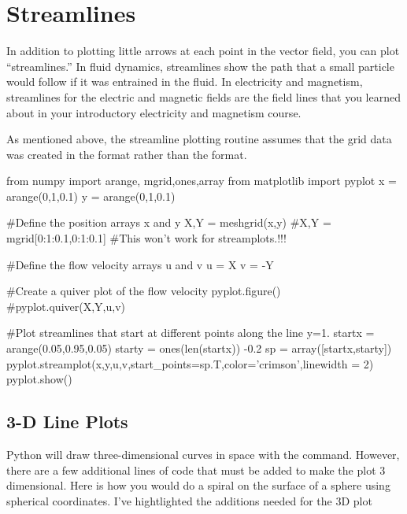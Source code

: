 \section{Streamlines}

In addition to plotting little arrows at each point in the vector field, you
can plot ``streamlines.'' In fluid dynamics, streamlines show the path that
a small particle would follow if it was entrained in the fluid.  In electricity and magnetism, streamlines for the
electric and magnetic fields are the field lines that you learned about in
your introductory electricity and magnetism course.

As mentioned above, the streamline plotting routine assumes that the grid data
was created in the  format rather than the  format.

\begin{codeexample}
\begin{VerbatimOut}{\listingFile}
from numpy import arange, mgrid,ones,array
from matplotlib import pyplot
x = arange(0,1,0.1)
y = arange(0,1,0.1)

#Define the position arrays x and y
X,Y = meshgrid(x,y)
#X,Y = mgrid[0:1:0.1,0:1:0.1]  #This won't work for streamplots.!!!

#Define the flow velocity arrays u and v
u = X
v = -Y

#Create a quiver plot of the flow velocity
pyplot.figure()
#pyplot.quiver(X,Y,u,v)

#Plot streamlines that start at different points along the line y=1.
startx = arange(0.05,0.95,0.05)
starty = ones(len(startx)) -0.2
sp = array([startx,starty])
pyplot.streamplot(x,y,u,v,start_points=sp.T,color='crimson',linewidth = 2)
pyplot.show()
\end{VerbatimOut}
\end{codeexample}

\subsection*{3-D Line Plots}
   Python will
draw three-dimensional curves in space with the  command.
However, there are a few additional lines of code that must be added
to make the plot 3 dimensional.  Here is how you would do a spiral on
the surface of a sphere using spherical coordinates.  I've
hightlighted the additions needed for the 3D plot

